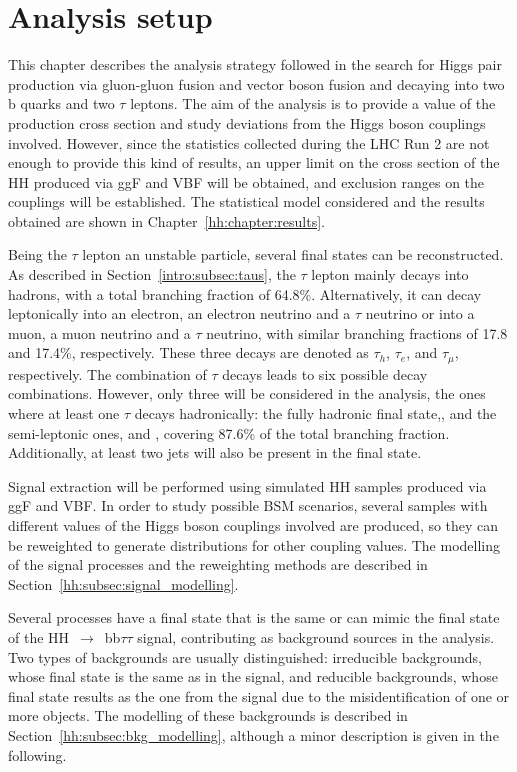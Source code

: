 \documentclass[../main.tex]{subfiles}
\begin{document}
\chapter{Analysis setup}
\label{hh:chapter:analysis}

This chapter describes the analysis strategy followed in the search for Higgs pair production via gluon-gluon fusion and vector boson fusion and decaying into two b quarks and two $\tau$ leptons. The aim of the analysis is to provide a value of the production cross section and study deviations from the Higgs boson couplings involved. However, since the statistics collected during the LHC Run 2 are not enough to provide this kind of results, an upper limit on the cross section of the HH produced via ggF and VBF will be obtained, and exclusion ranges on the couplings will be established. The statistical model considered and the results obtained are shown in Chapter~\ref{hh:chapter:results}.

Being the $\tau$ lepton an unstable particle, several final states can be reconstructed. As described in Section~\ref{intro:subsec:taus}, the $\tau$ lepton mainly decays into hadrons, with a total branching fraction of 64.8\%. Alternatively, it can decay leptonically into an electron, an electron neutrino and a $\tau$ neutrino or into a muon, a muon neutrino and a $\tau$ neutrino, with similar branching fractions of 17.8 and 17.4\%, respectively. These three decays are denoted as $\tau_h$, $\tau_e$, and $\tau_\mu$, respectively. The combination of $\tau$ decays leads to six possible decay combinations. However, only three will be considered in the analysis, the ones where at least one $\tau$ decays hadronically: the fully hadronic final state,\tauh\tauh{}, and the semi-leptonic ones, \taue\tauh{} and \taumu\tauh, covering 87.6\% of the total branching fraction. Additionally, at least two jets will also be present in the final state.

Signal extraction will be performed using simulated HH samples produced via ggF and VBF. In order to study possible BSM scenarios, several samples with different values of the Higgs boson couplings involved are produced, so they can be reweighted to generate distributions for other coupling values. The modelling of the signal processes and the reweighting methods are described in Section~\ref{hh:subsec:signal_modelling}.

Several processes have a final state that is the same or can mimic the final state of the HH~$\to$~bb$\tau\tau$ signal, contributing as background sources in the analysis. Two types of backgrounds are usually distinguished: irreducible backgrounds, whose final state is the same as in the signal, and reducible backgrounds, whose final state results as the one from the signal due to the misidentification of one or more objects. The modelling of these backgrounds is described in Section~\ref{hh:subsec:bkg_modelling}, although a minor description is given in the following.
\end{document}
